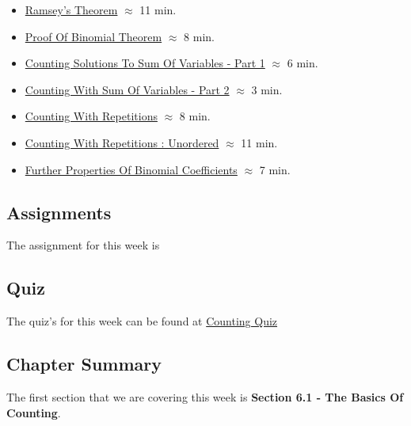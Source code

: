\begin{itemize}
    \item \href{https://applied.cs.colorado.edu/mod/hvp/view.php?id=51805}{Ramsey's Theorem} $\approx$ 11 min.
    \item \href{https://applied.cs.colorado.edu/mod/hvp/view.php?id=51806}{Proof Of Binomial Theorem} $\approx$ 8 min.
    \item \href{https://applied.cs.colorado.edu/mod/hvp/view.php?id=51807}{Counting Solutions To Sum Of Variables - Part 1} $\approx$ 6 min.
    \item \href{https://applied.cs.colorado.edu/mod/hvp/view.php?id=51808}{Counting With Sum Of Variables - Part 2} $\approx$ 3 min.
    \item \href{https://applied.cs.colorado.edu/mod/hvp/view.php?id=51809}{Counting With Repetitions} $\approx$ 8 min.
    \item \href{https://applied.cs.colorado.edu/mod/hvp/view.php?id=51810}{Counting With Repetitions : Unordered} $\approx$ 11 min.
    \item \href{https://applied.cs.colorado.edu/mod/hvp/view.php?id=51811}{Further Properties Of Binomial Coefficients} $\approx$ 7 min.
\end{itemize}

\subsection{Assignments}

The assignment for this week is   

\subsection{Quiz}

The quiz's for this week can be found at \href{https://applied.cs.colorado.edu/mod/quiz/view.php?id=51813}{Counting Quiz} \textbullet {}  

\subsection{Chapter Summary}

The first section that we are covering this week is \textbf{Section 6.1 - The Basics Of Counting}.

